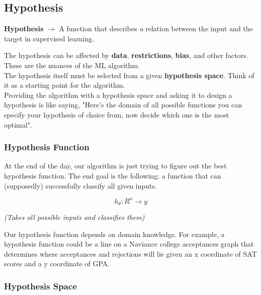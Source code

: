 \documentclass[english, 10pt]{article}
\begin{document}
\subsection{Hypothesis}

\begin{tcolorbox}[title=Definition:,colframe=red!75!black,colback=red!5!white,arc=0pt,fonttitle=\bfseries]
\textbf{Hypothesis} $\rightarrow$ A function that describes \textit{a} relation between the input and the target in supervised learning.
\end{tcolorbox}

\hfill \break The hypothesis can be affected by \textbf{data}, \textbf{restrictions}, \textbf{bias}, and other factors. These are the nuances of the ML algorithm.\\

The hypothesis itself must be selected from a given \textbf{hypothesis space}. Think of it as a starting point for the algorithm.\\

Providing the algorithm with a hypothesis space and asking it to design a hypothesis is like saying, "Here's the domain of all possible functions you can specify your hypothesis of choice from, now decide which one is the most optimal".\\

\subsubsection{Hypothesis Function}

At the end of the day, our algorithm is just trying to figure out the best hypothesis function. The end goal is the following: a function that can (supposedly) successfully classify all given inputs.

$$ h_{\theta}:R^n \rightarrow y $$
\begin{center}
\textit{(Takes all possible inputs and classifies them)}
\end{center} 

Our hypothesis function depends on domain knowledge. For example, a hypothesis function could be a line on a Naviance college acceptances graph that determines where acceptances and rejections will lie given an x coordinate of SAT scores and a y coordinate of GPA.

\subsubsection{Hypothesis Space}
\end{document}
